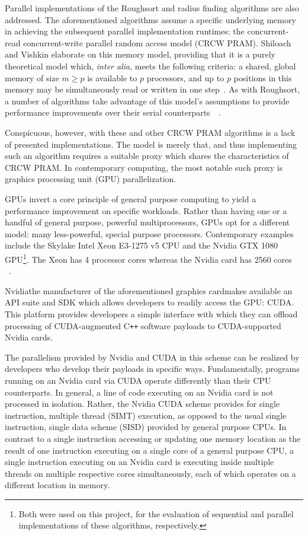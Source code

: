 \documentclass[letterpaper, 12pt]{article}
\let\supercite\cite
\renewcommand{\cite}[1]{\textnormal{~\supercite{#1}}}
\begin{document}
  Parallel implementations of the Roughsort and radius finding algorithms are also addressed.  The aforementioned algorithms 
  assume a specific underlying memory in achieving the subsequent parallel implementation runtimes: the concurrent-read 
  concurrent-write parallel random access model (CRCW PRAM).  Shiloach and Vishkin elaborate on this memory model, providing
  that it is a purely theoretical model which, \textit{inter alia}, meets the following criteria: a shared, global memory of
  size $m \geq p$ is available to $p$ processors, and up to $p$ positions in this memory may be simultaneously read or written
  in one step\cite{shiloach1981}.  As with Roughsort, a number of algorithms take advantage of this model\textquoteright s 
  assumptions to provide performance improvements over their serial counterparts\cite{shiloach1982}\cite{raj1989}.

  Conspicuous, however, with these and other CRCW PRAM algorithms is a lack of presented implementations.  The model is merely
  that, and thus implementing such an algorithm requires a suitable proxy which shares the characteristics of CRCW PRAM.  In 
  contemporary computing, the most notable such proxy is graphics processing unit (GPU) parallelization.

  GPUs invert a core principle of general purpose computing to yield a performance improvement on specific workloads.  Rather
  than having one or a handful of general purpose, powerful multiprocessors, GPUs opt for a different model: many less-powerful,
  special purpose processors.  Contemporary examples include the Skylake Intel Xeon E3-1275 v5 CPU and the Nvidia GTX 1080 
  GPU\footnote{Both were used on this project, for the evaluation of sequential and parallel implementations of these algorithms,
  respectively.}. The Xeon has 4 processor cores whereas the Nvidia card has 2560 cores \cite{xeon} \cite{geforce}.

  Nvidia\textemdash the manufacturer of the aforementioned graphics card\textemdash makes available an API suite and SDK which
  allows developers to readily access the GPU: CUDA.  This platform provides developers a simple interface with which they can
  offload processing of CUDA-augmented C\texttt{++} software payloads to CUDA-supported Nvidia cards.

  The parallelism provided by Nvidia and CUDA in this scheme can be realized by developers who develop their payloads in specific
  ways.  Fundamentally, programs running on an Nvidia card via CUDA operate differently than their  CPU counterparts.  In general,
  a line of code executing on an Nvidia card is not processed in isolation.  Rather, the Nvidia CUDA scheme provides for single 
  instruction, multiple thread (SIMT) execution, as opposed to the usual single instruction, single data scheme (SISD) provided by
  general purpose CPUs.  In contrast to a single instruction accessing or updating one memory location as the result of one 
  instruction executing on a single core of a general purpose CPU, a single instruction executing on an Nvidia card is executing 
  inside multiple threads on multiple respective cores simultaneously, each of which operates on a different location in memory.
\end{document}
